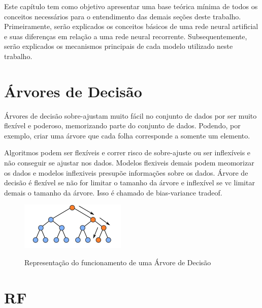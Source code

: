 
Este capítulo tem como objetivo apresentar uma base teórica mínima de todos os conceitos necessários para o entendimento das demais seções deste trabalho. Primeiramente, serão explicados os conceitos básicos de uma rede neural artificial e suas diferenças em relação a uma rede neural recorrente. Subsequentemente, serão explicados os mecanismos principais de cada modelo utilizado neste trabalho.

\section{Árvores de Decisão}


Árvores de decisão sobre-ajustam muito fácil no conjunto de dados por ser muito flexível e poderoso, memorizando parte do conjunto de dados. Podendo, por exemplo, criar uma árvore que cada folha corresponde a somente um elemento.

 Algoritmos podem ser flexíveis e correr risco de sobre-ajuste ou ser inflexíveis e não conseguir se ajustar nos dados. Modelos flexiveis demais podem  meomorizar os dados e modelos inflexiveis presupõe informações sobre os dados.
 Árvore de decisão é flexível se não for limitar o tamanho da árvore e inflexível se vc limitar demais o tamanho da árvore. Isso é chamado de bias-variance tradeof.
 
 \begin{figure}[htbp]
    \centering
    \includegraphics[scale=1.5]{monography/img/decision_tree.png}
    \label{figure:decision_tree}
    \caption[Representação do funcionamento de uma Árvore de Decisão]{Representação do funcionamento de uma Árvore de Decisão\footnotemark}
\end{figure}


\section{\acrfull{RF}}

